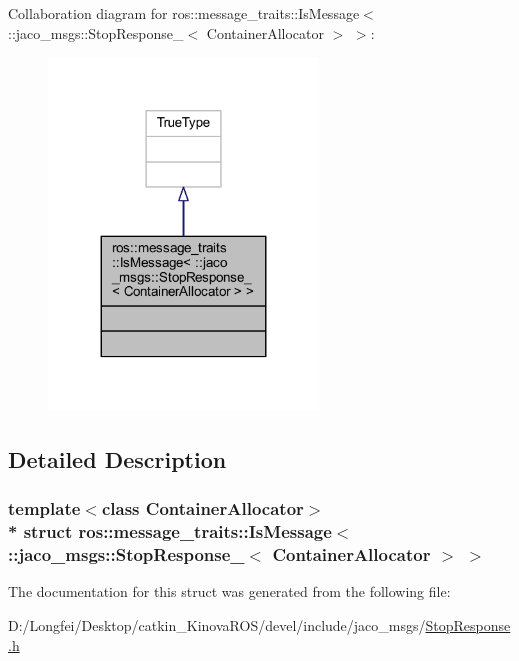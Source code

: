 Collaboration diagram for ros\+:\+:message\+\_\+traits\+:\+:Is\+Message$<$ \+:\+:jaco\+\_\+msgs\+:\+:Stop\+Response\+\_\+$<$ Container\+Allocator $>$ $>$\+:
\nopagebreak
\begin{figure}[H]
\begin{center}
\leavevmode
\includegraphics[width=203pt]{df/d32/structros_1_1message__traits_1_1IsMessage_3_01_1_1jaco__msgs_1_1StopResponse___3_01ContainerAllocator_01_4_01_4__coll__graph}
\end{center}
\end{figure}


\subsection{Detailed Description}
\subsubsection*{template$<$class Container\+Allocator$>$\\*
struct ros\+::message\+\_\+traits\+::\+Is\+Message$<$ \+::jaco\+\_\+msgs\+::\+Stop\+Response\+\_\+$<$ Container\+Allocator $>$ $>$}



The documentation for this struct was generated from the following file\+:\begin{DoxyCompactItemize}
\item 
D\+:/\+Longfei/\+Desktop/catkin\+\_\+\+Kinova\+R\+O\+S/devel/include/jaco\+\_\+msgs/\hyperlink{StopResponse_8h}{Stop\+Response.\+h}\end{DoxyCompactItemize}
